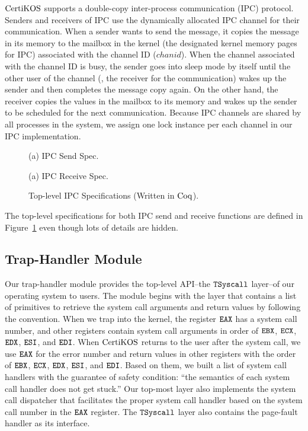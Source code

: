 $\mathrm{CertiKOS}$ supports a double-copy inter-process communication (IPC) protocol.
Senders and receivers of IPC use the dynamically allocated IPC channel for their communication. 
When a sender wants to send the message, 
it copies the message in its memory to the mailbox in the kernel (the designated kernel memory pages for IPC) associated with the channel ID ($chanid$).
When the channel associated with the channel ID is busy, the sender goes into  sleep mode by itself until the other user of the channel
(\ie, the receiver for the communication) wakes up the sender and then completes the message copy again. 
On the other hand, the receiver copies the values in the mailbox to its memory and wakes up the sender to be scheduled for the next communication. 
Because IPC channels are shared by all processes in the system, 
we assign one lock instance per each channel in our IPC implementation.
 \begin{figure}
\begin{center}

(a) IPC Send Spec.
 
(a) IPC Receive Spec.
\end{center}
\caption{Top-level IPC Specifications (Written in $\mathrm{Coq}$).}
\label{fig:chapter:certikos:ipc-specs}
\end{figure}
The top-level specifications for both IPC send and receive functions are defined in Figure~\ref{fig:chapter:certikos:ipc-specs}
even though lots of details are hidden. 


\subsection{Trap-Handler Module}
\label{chapter:certikos:subsec:trap-handler-module}

Our trap-handler module provides the top-level API--the ${{\mathrm{\texttt{TSyscall}}}}$ layer--of our operating system to users.  
The module begins with the layer that contains a list of primitives to retrieve the system call arguments and return values
by following the convention.
When we trap into the kernel, the register ${\mathrm{\texttt{EAX}}}$ has a system call number, and other registers contain system call arguments in order of ${\mathrm{\texttt{EBX}}}$, ${\mathrm{\texttt{ECX}}}$, ${\mathrm{\texttt{EDX}}}$, ${\mathrm{\texttt{ESI}}}$, and ${\mathrm{\texttt{EDI}}}$. 
When $\mathrm{CertiKOS}$ returns to the user after the system call, we use ${\mathrm{\texttt{EAX}}}$ for the error number and 
return values in other registers with the order of 
 ${\mathrm{\texttt{EBX}}}$, ${\mathrm{\texttt{ECX}}}$, ${\mathrm{\texttt{EDX}}}$, ${\mathrm{\texttt{ESI}}}$, and ${\mathrm{\texttt{EDI}}}$. 
Based on them, 
we built a list of system call handlers with the guarantee of safety condition:
``the semantics of each system call handler does not get stuck.'' 
Our top-most layer also implements the system call dispatcher that facilitates the proper system call handler based on the system call number in the ${\mathrm{\texttt{EAX}}}$ register.
The ${{\mathrm{\texttt{TSyscall}}}}$ layer also contains the page-fault handler as its interface.

